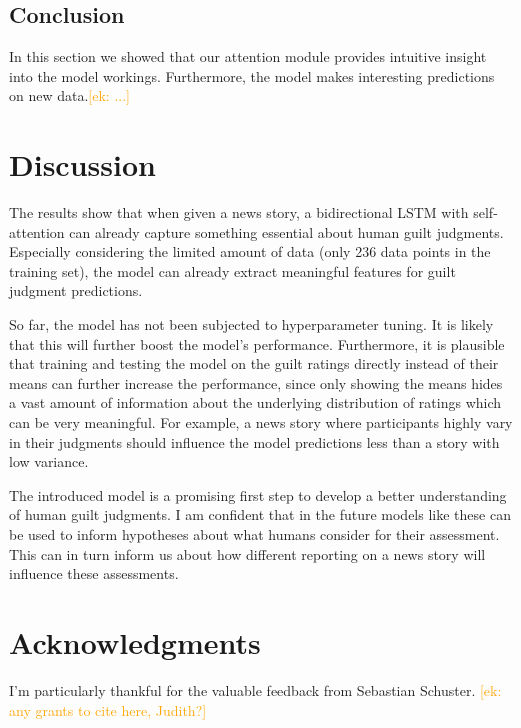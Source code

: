 \documentclass[11pt,a4paper]{article}
\newcommand{\ek}[1]{\textcolor{Orange}{[ek: #1]}}
\begin{document}
\subsection{Conclusion}

In this section we showed that our attention module provides intuitive insight into the model workings. Furthermore, the model makes interesting predictions on new data.\ek{...}

\section{Discussion}

The results show that when given a news story, a bidirectional LSTM with self-attention can already capture something essential about human guilt judgments. Especially considering the limited amount of data (only 236 data points in the training set), the model can already extract meaningful features for guilt judgment predictions. 

So far, the model has not been subjected to hyperparameter tuning. It is likely that this will further boost the model's performance. Furthermore, it is plausible that training and testing the model on the guilt ratings directly instead of their means can further increase the performance, since only showing the means hides a vast amount of information about the underlying distribution of ratings which can be very meaningful. For example, a news story where participants highly vary in their judgments should influence the model predictions less than a story with low variance.

The introduced model is a promising first step to develop a better understanding of human guilt judgments. I am confident that in the future models like these can be used to inform hypotheses about what humans consider for their assessment. This can in turn inform us about how different reporting on a news story will influence these assessments.



\section*{Acknowledgments}

I'm particularly thankful for the valuable feedback from Sebastian Schuster. \ek{any grants to cite here, Judith?} \\

\end{document}
